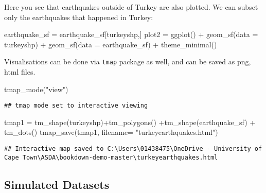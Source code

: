 \documentclass[
]{book}
\newenvironment{Shaded}{\begin{snugshade}}{\end{snugshade}}
\newcommand{\AttributeTok}[1]{\textcolor[rgb]{0.77,0.63,0.00}{#1}}
\newcommand{\FunctionTok}[1]{\textcolor[rgb]{0.00,0.00,0.00}{#1}}
\newcommand{\NormalTok}[1]{#1}
\newcommand{\OtherTok}[1]{\textcolor[rgb]{0.56,0.35,0.01}{#1}}
\newcommand{\SpecialCharTok}[1]{\textcolor[rgb]{0.00,0.00,0.00}{#1}}
\newcommand{\StringTok}[1]{\textcolor[rgb]{0.31,0.60,0.02}{#1}}
\begin{document}
Here you see that earthquakes outside of Turkey are also plotted. We can subset only the earthquakes that happened in Turkey:

\begin{Shaded}
\begin{Highlighting}[]
\NormalTok{earthquake\_sf }\OtherTok{=}\NormalTok{ earthquake\_sf[turkeyshp,]}
\NormalTok{plot2 }\OtherTok{=} \FunctionTok{ggplot}\NormalTok{() }\SpecialCharTok{+}
  \FunctionTok{geom\_sf}\NormalTok{(}\AttributeTok{data =}\NormalTok{ turkeyshp) }\SpecialCharTok{+}
  \FunctionTok{geom\_sf}\NormalTok{(}\AttributeTok{data =}\NormalTok{ earthquake\_sf) }\SpecialCharTok{+}
  \FunctionTok{theme\_minimal}\NormalTok{()}
\end{Highlighting}
\end{Shaded}

Visualisations can be done via \texttt{tmap} package as well, and can be saved as png, html files.

\begin{Shaded}
\begin{Highlighting}[]
\FunctionTok{tmap\_mode}\NormalTok{(}\StringTok{"view"}\NormalTok{)}
\end{Highlighting}
\end{Shaded}

\begin{verbatim}
## tmap mode set to interactive viewing
\end{verbatim}

\begin{Shaded}
\begin{Highlighting}[]
\NormalTok{tmap1 }\OtherTok{=} \FunctionTok{tm\_shape}\NormalTok{(turkeyshp)}\SpecialCharTok{+}\FunctionTok{tm\_polygons}\NormalTok{() }\SpecialCharTok{+}\FunctionTok{tm\_shape}\NormalTok{(earthquake\_sf) }\SpecialCharTok{+} \FunctionTok{tm\_dots}\NormalTok{()}
\FunctionTok{tmap\_save}\NormalTok{(tmap1, }\AttributeTok{filename=} \StringTok{"turkeyearthquakes.html"}\NormalTok{)}
\end{Highlighting}
\end{Shaded}

\begin{verbatim}
## Interactive map saved to C:\Users\01438475\OneDrive - University of Cape Town\ASDA\bookdown-demo-master\turkeyearthquakes.html
\end{verbatim}

\hypertarget{simulated-datasets}{%
\subsection{Simulated Datasets}\label{simulated-datasets}}
\end{document}

